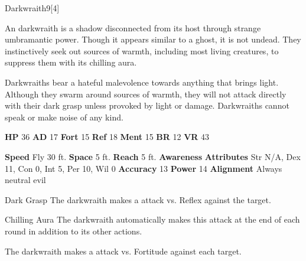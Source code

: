  
  
  \begin{monsection}{Darkwraith}{9}[4]
    \vspace{-1em}\vspace{-1em}
    \vspace{0em}

    
        An darkwraith is a shadow disconnected from its host through strange umbramantic power.
        Though it appears similar to a ghost, it is not undead.
        They instinctively seek out sources of warmth, including most living creatures, to suppress them with its chilling aura.
      
        Darkwraiths bear a hateful malevolence towards anything that brings light.
        Although they swarm around sources of warmth, they will not attack directly with their dark grasp unless provoked by light or damage.
        Darkwraiths cannot speak or make noise of any kind.
      

    \begin{spellcontent}
      \begin{spelltargetinginfo}
        \pari \textbf{HP} 36 \monsep
          \textbf{AD} 17 \monsep
          \textbf{Fort} 15 \monsep
          \textbf{Ref} 18 \monsep
          \textbf{Ment} 15
        \pari \textbf{BR} 12 \monsep
        \textbf{VR} 43
        
      \end{spelltargetinginfo}
    \end{spellcontent}
    \begin{monsterfooter}
      \pari \textbf{Speed} Fly 30 ft. \monsep
        \textbf{Space} 5 ft. \monsep
        \textbf{Reach} 5 ft.
      \pari \textbf{Awareness} 
      \pari \textbf{Attributes}
        Str N/A, Dex 11,
        Con 0, Int 5,
        Per 10, Wil 0
      \pari \textbf{Accuracy} 13 \monsep
        \textbf{Power} 14
      \pari \textbf{Alignment} Always neutral evil
    \end{monsterfooter}
  \end{monsection}
  \begin{freeability}{Dark Grasp}
       The darkwraith makes a  attack
        vs. Reflex against the target.
    \end{freeability}
  

    \begin{freeability}{Chilling Aura}
      The darkwraith automatically makes this attack at the end of each round in addition to its other actions.
          \par The darkwraith makes a  attack
        vs. Fortitude against each target.
    \end{freeability}
  
